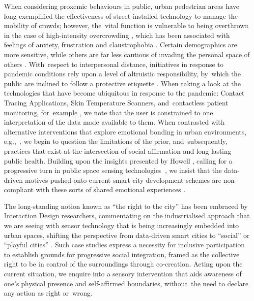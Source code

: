 {%
When considering proxemic behaviours in public, urban pedestrian areas have long exemplified the effectiveness of street-installed technology to manage the mobility of crowds; however, the~vital function is vulnerable to being overthrown in the case of high-intensity overcrowding \citep{gehl_public_2004,machleit_perceived_2000}, which has been associated with feelings of anxiety, frustration and claustrophobia \citep{kendrick_user_2010}. Certain demographics are more sensitive, while others are far less cautious of invading the personal space of others \citep{peimani_where_2016,remland_interpersonal_1995}. With~respect to interpersonal distance, initiatives in response to pandemic conditions rely upon a level of altruistic responsibility, by~which the public are inclined to follow a protective etiquette \citep{honey-roses_impact_2020}. When taking a look at the technologies that have become ubiquitous in response to the pandemic: Contact Tracing Applications, Skin Temperature Scanners, and~contactless patient monitoring, for~example \citep{mehrdad_perspective_2021,taylor_review_2020}, we note that the user is constrained to one interpretation of the data made available to them. When contrasted with alternative interventions that explore emotional bonding in urban environments, e.g.,~\citep{adhitya_london_2018,gatehouse_feral_2016}, we begin to question the limitations of the prior, and~subsequently, practices that exist at the intersection of social affirmation and long-lasting public health. Building upon the insights presented by Howell \cite{howell_life-affirming_2019}, calling for a progressive turn in public space sensing technologies~\cite{howell_life-affirming_2019}, we insist that the data-driven motives pushed onto current smart city development schemes are non-compliant with these sorts of shared emotional experiences \citep{battarbee_pools_2002,lange_owning_2013,bueno_smart_2016}.

The long-standing notion known as
``the right to the city'' has been embraced by Interaction Design researchers, commentating on the industrialised approach that we are seeing with sensor technology that is being increasingly embedded into urban spaces, shifting the perspective from data-driven smart cities to
``social'' or ``playful cities'' \citep{castro_seixas_urban_2021,howell_life-affirming_2019}. Such case studies express a necessity for inclusive participation to establish grounds for progressive social integration, framed as the collective right to be in control of the surroundings through co-creation. Acting upon the current situation, we enquire into a sensory intervention that aids awareness of one's physical presence and self-affirmed boundaries, without~the need to declare any action as right or~wrong.

}

